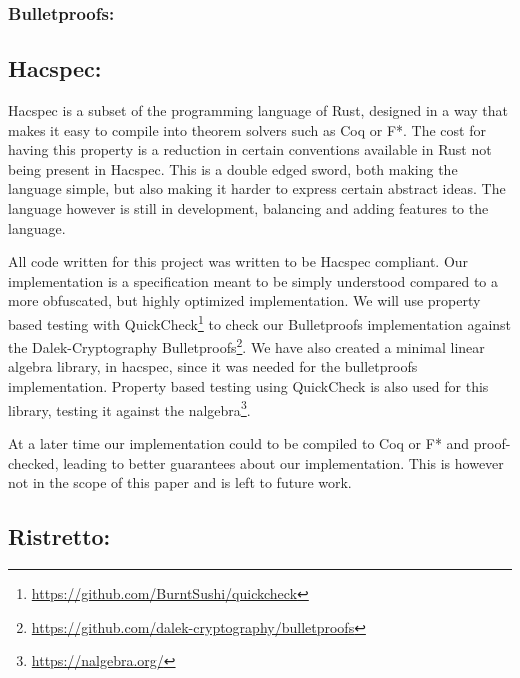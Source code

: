 \documentclass{article}
\begin{document}
\subsubsection{Bulletproofs:}


\subsection{Hacspec:} \label{Hacspec}

Hacspec is a subset of the programming language of Rust, designed in a way that makes it easy to compile into theorem solvers such as Coq or F*. The cost for having this property is a reduction in certain conventions available in Rust not being present in Hacspec. This is a double edged sword, both making the language simple, but also making it harder to express certain abstract ideas. The language however is still in development, balancing and adding features to the language.

All code written for this project was written to be Hacspec compliant. Our implementation is a specification meant to be simply understood compared to a more obfuscated, but highly optimized implementation. We will use property based testing with QuickCheck\footnote{\url{https://github.com/BurntSushi/quickcheck}} to check our Bulletproofs implementation against the Dalek-Cryptography Bulletproofs\footnote{\url{https://github.com/dalek-cryptography/bulletproofs}}. We have also created a minimal linear algebra library, in hacspec, since it was needed for the bulletproofs implementation. Property based testing using QuickCheck is also used for this library, testing it against the nalgebra\footnote{\url{https://nalgebra.org/}}.

At a later time our implementation could to be compiled to Coq or F* and proof-checked, leading to better guarantees about our implementation. This is however not in the scope of this paper and is left to future work. %

\subsection{Ristretto:} \label{ristretto}
\end{document}
